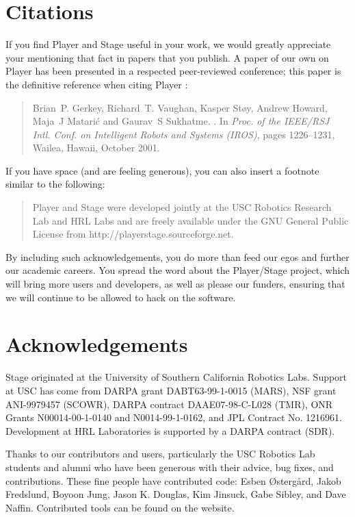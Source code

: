 \documentclass[11pt]{report}
\begin{document}
\section{Citations}
If you find Player and Stage useful in your work, we would greatly
appreciate your mentioning that fact in papers that you publish.  A
paper of our own on Player has been presented in a respected
peer-reviewed conference; this paper is the definitive reference when
citing Player \cite{GerkeyVaughan01a}:
\begin{quote}
Brian~P. Gerkey, Richard~T. Vaughan, Kasper St\o{}y, Andrew Howard,
Maja~J Matari\'c and Gaurav~S Sukhatme.
.
\newblock In {\em Proc. of the IEEE/RSJ Intl. Conf. on Intelligent Robots and
  Systems (IROS)}, pages 1226--1231, Wailea, Hawaii, October 2001.
\end{quote}
If you have space (and are feeling generous), you can also insert a footnote
similar to the following:
\begin{quote}
Player and Stage were developed jointly at the USC Robotics Research
Lab and HRL Labs and are freely available under the GNU General Public
License from http://playerstage.sourceforge.net.
\end{quote}
By including such acknowledgements, you do more than feed our egos and
further our academic careers.  You spread the word about the
Player/Stage project, which will bring more users and developers, as
well as please our funders, ensuring that we will continue to be
allowed to hack on the software.

  \section{Acknowledgements}

Stage originated at the University of Southern California Robotics
    Labs. Support at USC has come from DARPA grant DABT63-99-1-0015
    (MARS), NSF grant ANI-9979457 (SCOWR), DARPA contract
    DAAE07-98-C-L028 (TMR), ONR Grants N00014-00-1-0140 and
    N0014-99-1-0162, and JPL Contract No. 1216961. Development at HRL
    Laboratories is supported by a DARPA contract (SDR). 

Thanks to our contributors and users, particularly the USC Robotics
Lab students and alumni who have been generous with their advice, bug
fixes, and contributions. These fine people have contributed code:
Esben \O{}sterg\aa{}rd, Jakob Fredslund, Boyoon Jung, Jason
K. Douglas, Kim Jinsuck, Gabe Sibley, and Dave Naffin. Contributed
tools can be found on the website.
\end{document}
